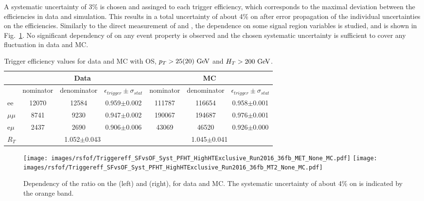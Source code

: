 A systematic uncertainty of 3\% is chosen and assinged to each trigger efficiency, which corresponds to the maximal deviation between the efficiencies in data and simulation.
This results in a total uncertainty of about 4\% on \RT after error propagation of the individual uncertainties on the efficiencies.
Similarly to the direct measurement of \Rsfof and \rmue, the dependence on some signal region variables is studied, and is shown in Fig.~\ref{fig:EffDependency}. 
No significant dependency of \RT on any event property is observed and the chosen systematic uncertainty is sufficient to cover any fluctuation in data and MC. 
\begin{table}[ht!]
\def\arraystretch{1.2}
\setlength{\belowcaptionskip}{6pt} 
\small                            
\centering                           
\caption{Trigger efficiency values for data and MC with OS, $p_T>25(20)\,\,\text{Ge\hspace{-.08em}V}$ and $H_T>200\,\,\text{Ge\hspace{-.08em}V}$.} 
\label{tab:TriggerEffValues}
\begin{tabular}{l c c c |c c c}  
\hline \hline
&\multicolumn{3}{c|}{Data} &\multicolumn{3}{c}{MC} \\\hline
& nominator & denominator & $\epsilon_{trigger} \pm \sigma_{stat}$ & nominator & denominator & $\epsilon_{trigger} \pm \sigma_{stat}$ \\    \hline
ee & 12070 & 12584 & 0.959$\pm$0.002 & 111787 & 116654 & 0.958$\pm$0.001 \\
$\mu\mu$ & 8741 & 9230 & 0.947$\pm$0.002 & 190067 & 194687 & 0.976$\pm$0.001 \\
e$\mu$ & 2437 & 2690 & 0.906$\pm$0.006 & 43069 & 46520 & 0.926$\pm$0.000 \\
\hline
$R_{T}$ & \multicolumn{3}{c|}{1.052$\pm$0.043}  & \multicolumn{3}{c}{1.045$\pm$0.041}  \\\hline\hline
\end{tabular}
\end{table}                                                                                                                                           
\begin{figure}[htbp!]
\begin{center}
    \texttt{[image: images/rsfof/Triggereff\_SFvsOF\_Syst\_PFHT\_HighHTExclusive\_Run2016\_36fb\_MET\_None\_MC.pdf]}
    \texttt{[image: images/rsfof/Triggereff\_SFvsOF\_Syst\_PFHT\_HighHTExclusive\_Run2016\_36fb\_MT2\_None\_MC.pdf]}
    \caption{Dependency of the \RT ratio on the \ptmiss (left) and \mttwo (right), for data and MC. The systematic uncertainty of about 4\% on \RT is indicated by the orange band.}
\label{fig:EffDependency}
\end{center}
\end{figure}                                                                                                                                                                              
